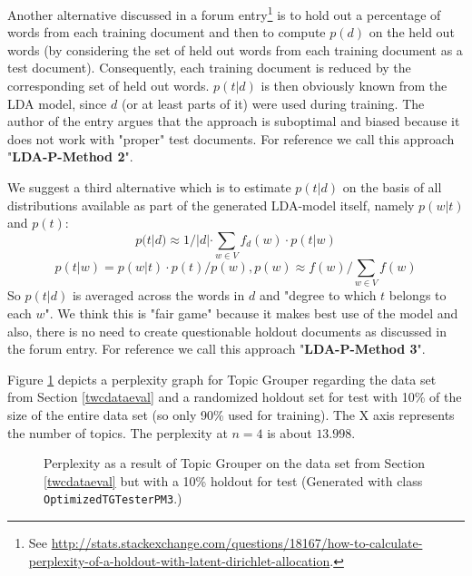 \documentclass[10pt, a4paper, oneside]{article}
\begin{document}
Another alternative discussed in a forum entry\footnote{See \href{http://stats.stackexchange.com/questions/18167/how-to-calculate-perplexity-of-a-holdout-with-latent-dirichlet-allocation}{{http://stats.stackexchange.com/questions/18167/how-to-calculate-perplexity-of-a-holdout-with-latent-dirichlet-allocation}}.} is to hold out a percentage of words from each training document and then to compute $p(d)$ on the held out words (by considering the set of held out words from each training document as a test document). Consequently, each training document is reduced by the corresponding set of held out words. $p(t|d)$ is then obviously known from the LDA model, since $d$ (or at least parts of it) were used during training. The author of the entry argues that the approach is suboptimal and biased because it does not work with "proper" test documents. For reference we call this approach "\textbf{LDA-P-Method 2}".

We suggest a third alternative which is to estimate $p(t|d)$ on the basis of all distributions available as part of the generated LDA-model itself, namely
$p(w|t)$ and $p(t)$:
\[ p(t|d) \approx 1 / |d| \cdot \sum_{w \in V} f_d(w) \cdot p(t|w)\]
\[ p(t|w) = p(w|t) \cdot p(t) / p(w), p(w) \approx f(w) / \sum_{w \in V} f(w)\]
So $p(t|d)$ is averaged across the words in $d$ and "degree to which $t$ belongs to each $w$".
We think this is "fair game" because it makes best use of the model and also, there is no need to create questionable holdout documents as discussed in the forum entry. For reference we call this approach "\textbf{LDA-P-Method 3}".

Figure \ref{perplexity1} depicts a perplexity graph for Topic Grouper regarding the data set from Section \ref{twcdataeval} and a randomized holdout set for test with 10\% of the size of the entire data set (so only 90\% used for training). The X axis represents the number of topics.
The perplexity at $n = 4$ is about $13.998$.

\begin{figure}
\caption{Perplexity as a result of Topic Grouper on the data set from Section \ref{twcdataeval} but with a 10\% holdout for test (Generated with class \texttt{OptimizedTGTesterPM3}.)}
\label{perplexity1}
\end{figure}
\end{document}
